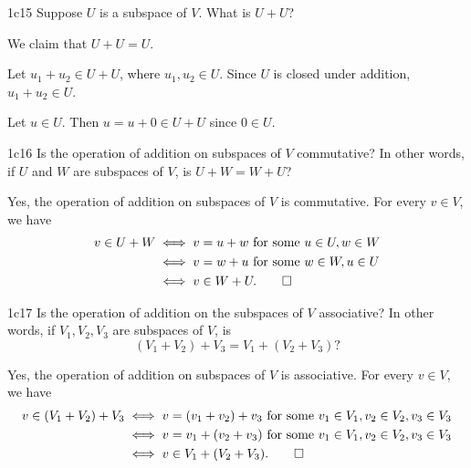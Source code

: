 \begin{exercise}{1c15}
    Suppose $U$ is a subspace of $V$.
	What is $U + U$?
\end{exercise}

\begin{sol}
    We claim that $U + U = U$.

    \rightset Let $u_1 + u_2 \in U + U$, where $u_1, u_2 \in U$.
    Since $U$ is closed under addition, $u_1 + u_2 \in U$.

    \leftset Let $u \in U$.
    Then $u = u + 0 \in U + U$ since $0 \in U$.
\end{sol}

\begin{exercise}{1c16}
    Is the operation of addition on subspaces of $V$ commutative?
	In other words, if $U$ and $W$ are subspaces of $V$, is $U + W = W + U$?
\end{exercise}

\begin{sol}
    Yes, the operation of addition on subspaces of $V$ is commutative.
    For every $v \in V$, we have
    \begin{align*}
        v \in U + W &\iff v = u + w \text{ for some } u \in U, w \in W \\
                    &\iff v = w + u \text{ for some } w \in W, u \in U \\
                    &\iff v \in W + U. \qedhere
    \end{align*}
\end{sol}

\begin{exercise}{1c17}
    Is the operation of addition on the subspaces of $V$ associative?
	In other words, if $V_1, V_2, V_3$ are subspaces of $V$, is
    \[
    	(V_1 + V_2) + V_3 = V_1 + (V_2 + V_3)?
    \]
\end{exercise}

\begin{sol}
    Yes, the operation of addition on subspaces of $V$ is associative.
	For every $v \in V$, we have
	\begin{align*}
	    v \in (V_1 + V_2) + V_3 &\iff v = (v_1 + v_2) + v_3 \text{ for some } v_1 \in V_1, v_2 \in V_2, v_3 \in V_3 \\
	                            &\iff v = v_1 + (v_2 + v_3) \text{ for some } v_1 \in V_1, v_2 \in V_2, v_3 \in V_3 \\
	                            &\iff v \in V_1 + (V_2 + V_3). \qedhere
	\end{align*}
\end{sol}

